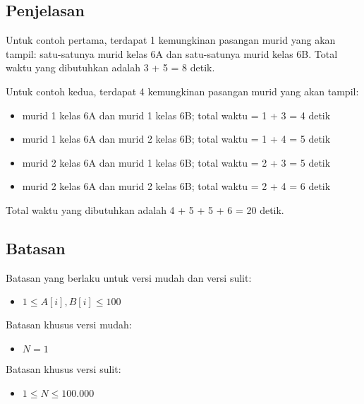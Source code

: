 \documentclass[../main_problemset.tex]{subfiles} %
\begin{document}
\subsection*{Penjelasan}

Untuk contoh pertama, terdapat 1 kemungkinan pasangan murid yang akan tampil: satu-satunya murid kelas 6A dan satu-satunya murid kelas 6B. Total waktu yang dibutuhkan adalah 3 + 5 = 8 detik.

Untuk contoh kedua, terdapat 4 kemungkinan pasangan murid yang akan tampil:
\begin{itemize}
	\item murid 1 kelas 6A dan murid 1 kelas 6B; total waktu = 1 + 3 = 4 detik
	\item murid 1 kelas 6A dan murid 2 kelas 6B; total waktu = 1 + 4 = 5 detik
	\item murid 2 kelas 6A dan murid 1 kelas 6B; total waktu = 2 + 3 = 5 detik
	\item murid 2 kelas 6A dan murid 2 kelas 6B; total waktu = 2 + 4 = 6 detik
\end{itemize}
Total waktu yang dibutuhkan adalah 4 + 5 + 5 + 6 = 20 detik.

\subsection*{Batasan}

Batasan yang berlaku untuk versi mudah dan versi sulit:

\begin{itemize}
	\item $1 \le A[i], B[i] \le 100$
\end{itemize}

Batasan khusus versi mudah:

\begin{itemize}
	\item $N = 1$
\end{itemize}

Batasan khusus versi sulit:

\begin{itemize}
	\item $1 \le N \le 100.000$
\end{itemize}
\end{document}
